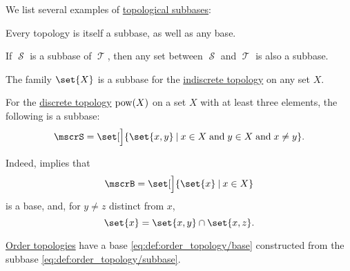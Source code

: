 \begin{example}\label{ex:def:topological_subbase}
  We list several examples of \hyperref[def:topological_subbase]{topological subbases}:
  \begin{thmenum}
     Every topology is itself a subbase, as well as any base.

     If \( \mscrS \) is a subbase of \( \mscrT \), then any set between \( \mscrS \) and \( \mscrT \) is also a subbase.

     The family \( \set{ X } \) is a subbase for the \hyperref[def:indiscrete_topology]{indiscrete topology} on any set \( X \).

     For the \hyperref[def:discrete_topology]{discrete topology} \( \operatorname{pow}(X) \) on a set \( X \) with at least three elements, the following is a subbase:
    \begin{equation*}
      \mscrS = \set[\Big]{ \set{ x, y } \given x \in X \T{and} y \in X \T{and} x \neq y }.
    \end{equation*}

    Indeed,  implies that
    \begin{equation*}
      \mscrB = \set[\Big]{ \set{ x } \given x \in X }
    \end{equation*}
    is a base, and, for \( y \neq z \) distinct from \( x \),
    \begin{equation*}
      \set{ x } = \set{ x, y } \cap \set{ x, z }.
    \end{equation*}

     \hyperref[def:order_topology]{Order topologies} have a base \eqref{eq:def:order_topology/base} constructed from the subbase \eqref{eq:def:order_topology/subbase}.
  \end{thmenum}
\end{example}

